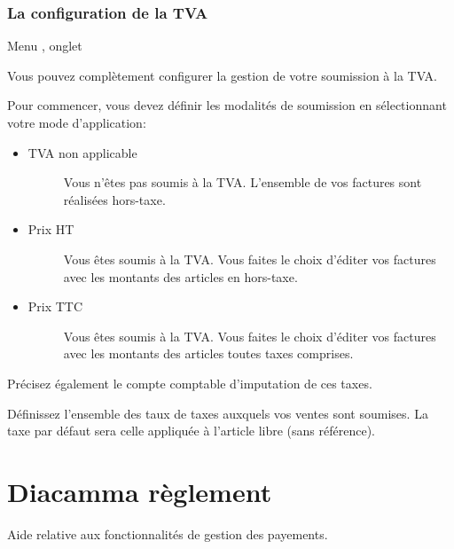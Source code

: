 \documentclass[a4paper,10pt,oneside,french]{sphinxmanual}
\begin{document}
\subsection{La configuration de la TVA}
\label{\detokenize{invoice/configuration:la-configuration-de-la-tva}}
Menu , onglet 

Vous pouvez complètement configurer la gestion de votre soumission à la TVA.

\noindent{}

Pour commencer, vous devez définir les modalités de soumission en sélectionnant votre mode d’application:
\begin{itemize}
\item {} \begin{description}
\item[{TVA non applicable}] \leavevmode
Vous n’êtes pas soumis à la TVA. L’ensemble de vos factures sont réalisées hors-taxe.

\end{description}

\item {} \begin{description}
\item[{Prix HT}] \leavevmode
Vous êtes soumis à la TVA. Vous faites le choix d’éditer vos factures avec les montants des articles en hors-taxe.

\end{description}

\item {} \begin{description}
\item[{Prix TTC}] \leavevmode
Vous êtes soumis à la TVA. Vous faites le choix d’éditer vos factures avec les montants des articles toutes taxes comprises.

\end{description}

\end{itemize}

Précisez également le compte comptable d’imputation de ces taxes.

Définissez l’ensemble des taux de taxes auxquels vos ventes sont soumises. La taxe par défaut sera celle appliquée à l’article libre (sans référence).


\chapter{Diacamma règlement}
\label{\detokenize{payoff/index::doc}}\label{\detokenize{payoff/index:diacamma-reglement}}
Aide relative aux fonctionnalités de gestion des payements.
\end{document}
